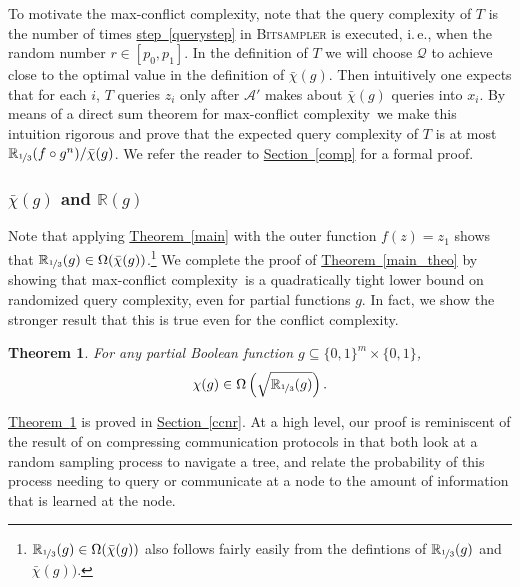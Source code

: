 \documentclass[11pt]{article}
\numberwithin{equation}{section}
\newtheorem{theorem}{Theorem}[section]
\theoremstyle{definition}
\theoremstyle{plain}
\newcommand{\R}{\mathbb R}
\newcommand{\ie}{i.\,e.}
\newcommand{\expref}[2]{\hyperref[#2]{#1~\ref{#2}}}
\newcommand{\dr}{\nicefrac}
\newcommand{\clQ}{\mathcal{Q}}
\newcommand{\ccc}{max-conflict complexity}
\begin{document}
To motivate the \ccc, note that the query complexity of $T$ is the number of times \expref{step}{querystep} in \textsc{Bitsampler} is executed, \ie,  when the random number $r \in [p_0, p_1]$.  In the definition of $T$ we will choose 
$\clQ$ to achieve close to the optimal value in the definition of $\bar \chi(g)$.  Then intuitively one expects that for each $i$, $T$ queries $z_i$ only after $\mathcal{A}'$ makes about $\bar \chi(g)$ queries into $x_i$.     
By means of a direct sum theorem for \ccc \ we make this intuition rigorous and prove that the expected query complexity of $T$ is at most $\R_{\dr13}(f \circ g^n)/ \bar \chi(g)$. 
We refer the reader to \expref{Section}{comp} for a formal proof.
%
\subsubsection{\texorpdfstring{$\bar \chi(g)$ and $\R(g)$}{chi-bar(g) and R(g)}}
Note that applying \expref{Theorem}{main} with the outer function $f(z) = z_1$ shows that $\R_{\dr13}(g) \in \Omega(\bar \chi(g))$.\footnote{$\R_{\dr13}(g) \in \Omega(\bar \chi(g))$ also follows fairly easily from the defintions of $\R_{\dr13}(g)$ and $\bar \chi(g))$.}
We complete the proof of \expref{Theorem}{main_theo} by showing that \ccc \ is a quadratically tight lower bound on randomized query complexity, even for partial functions $g$.  In fact, we show the stronger result that this is true even for the 
conflict complexity.
\begin{theorem}
\label{mainaStr}
For any partial Boolean function $g \subseteq \{0,1\}^m \times \{0,1\}$,
\[\chi(g)\in\Omega\left(\sqrt{\R_{\dr13}(g)}\right).\]
\end{theorem}
\expref{Theorem}{mainaStr} is proved in \expref{Section}{ccnr}. At a high level, our proof is reminiscent of the result of \cite{DBLP:journals/siamcomp/BarakBCR13} on compressing communication protocols in that both look at a random sampling process to navigate a tree, and relate the probability of 
this process needing to query or communicate at a node to the amount of information that is learned at the node. 
\end{document}
